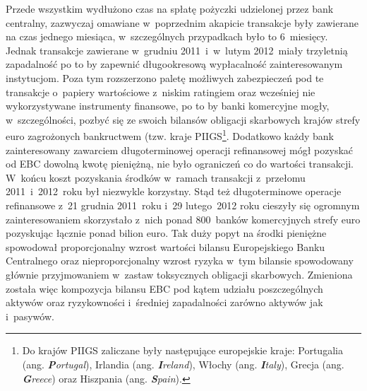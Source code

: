Przede wszystkim wydłużono czas na spłatę pożyczki udzielonej przez bank centralny, zazwyczaj omawiane w~poprzednim akapicie transakcje były zawierane na czas jednego miesiąca\cite{ebc22}, w~szczególnych przypadkach było to 6~miesięcy. Jednak transakcje zawierane w~grudniu 2011~i~w~lutym 2012~miały trzyletnią zapadalność po to by zapewnić długookresową wypłacalność zainteresowanym instytucjom. Poza tym rozszerzono paletę możliwych zabezpieczeń pod te transakcje o~papiery wartościowe z~niskim ratingiem oraz wcześniej nie wykorzystywane instrumenty finansowe, po to by banki komercyjne mogły, w~szczególności, pozbyć się ze swoich bilansów obligacji skarbowych krajów strefy euro zagrożonych bankructwem (tzw. kraje \acs{PIIGS}\footnote{Do krajów \acs{PIIGS} zaliczane były następujące europejskie kraje: Portugalia (ang. \textit{\textbf{P}ortugal}), Irlandia (ang. \textit{\textbf{I}reland}), Włochy (ang. \textit{\textbf{I}taly}), Grecja (ang. \textit{\textbf{G}reece}) oraz Hiszpania (ang. \textit{\textbf{S}pain}).}. Dodatkowo każdy bank zainteresowany zawarciem długoterminowej operacji refinansowej mógł pozyskać od EBC dowolną kwotę pieniężną, nie było ograniczeń co do wartości transakcji. W~końcu koszt pozyskania środków w~ramach transakcji z~przełomu 2011~i~2012~roku był niezwykle korzystny. Stąd też długoterminowe operacje refinansowe z~21 grudnia 2011~roku i~29 lutego~2012 roku cieszyły się ogromnym zainteresowaniem skorzystało z~nich ponad 800~banków komercyjnych strefy euro pozyskując łącznie ponad bilion euro. Tak duży popyt na środki pieniężne spowodował proporcjonalny wzrost wartości bilansu Europejskiego Banku Centralnego oraz nieproporcjonalny wzrost ryzyka w~tym bilansie spowodowany głównie przyjmowaniem w~zastaw toksycznych obligacji skarbowych. Zmieniona została więc kompozycja bilansu \acs{EBC} pod kątem udziału poszczególnych aktywów oraz ryzykowności i~średniej zapadalności zarówno aktywów jak i~pasywów. 

